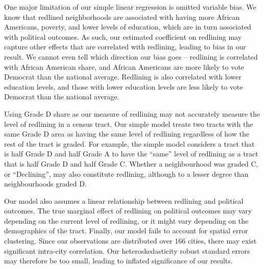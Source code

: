 \documentclass{eco_375_paper}
\begin{document}
One major limitation of our simple linear regression is omitted variable bias. We know that redlined neighborhoods are associated with having more African Americans, poverty, and lower levels of education, which are in turn associated with political outcomes. As such, our estimated coefficient on redlining may capture other effects that are correlated with redlining, leading to bias in our result. We cannot even tell which direction our bias goes – redlining is correlated with African American share, and African Americans are more likely to vote Democrat than the national average. Redlining is also correlated with lower education levels, and those with lower education levels are less likely to vote Democrat than the national average.

Using Grade D share as our measure of redlining may not accurately measure the level of redlining in a census tract. Our simple model treats two tracts with the same Grade D area as having the same level of redlining regardless of how the rest of the tract is graded. For example, the simple model considers a tract that is half Grade D and half Grade A to have the “same” level of redlining as a tract that is half Grade D and half Grade C. Whether a neighbourhood was graded C, or “Declining”,  may also constitute redlining, although to a lesser degree than neighbourhoods graded D.

Our model also assumes a linear relationship between redlining and political outcomes. The true marginal effect of redlining on political outcomes may vary depending on the current level of redlining, or it might vary depending on the demographics of the tract. Finally, our model fails to account for spatial error clustering. Since our observations are distributed over 166 cities, there may exist significant intra-city correlation. Our heteroskedasticity robust standard errors may therefore be too small, leading to inflated significance of our results.
\end{document}
